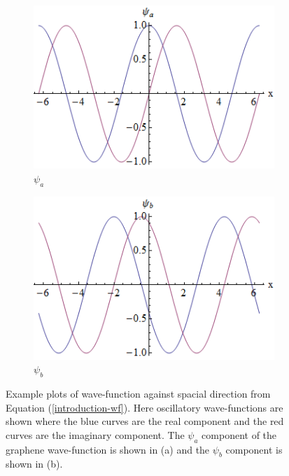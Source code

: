 \begin{figure}
	\begin{subfigure}{0.45\textwidth}
		\centerline{\includegraphics[scale=0.6]{images/oscillitary-psi-a}}
		\caption{$\psi_{a}$}
		\label{}
	\end{subfigure}
	\hspace{1.2cm}
	\begin{subfigure}{0.45\textwidth}
		\centerline{\includegraphics[scale=0.6]{images/oscillitary-psi-b}}
		\caption{$\psi_{b}$}
		\label{}
	\end{subfigure}
	\caption{Example plots of wave-function against spacial direction from Equation (\ref{introduction-wf}). Here oscillatory wave-functions are shown where the blue curves are the real component and the red curves are the imaginary component. The $\psi_{a}$ component of the graphene wave-function is shown in (a) and the $\psi_{b}$ component is shown in (b).}
	\label{oscillitary-psi-a}
\end{figure}
